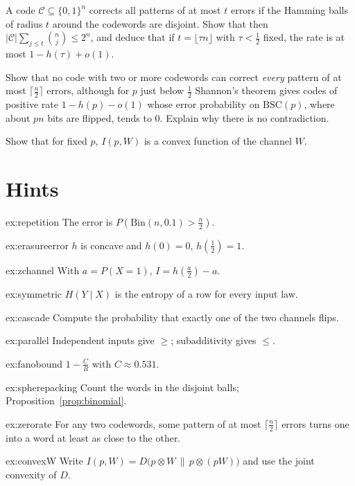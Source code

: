 \begin{exercise}[$\star\star$]\label{ex:spherepacking}
A code $\mathcal C\subseteq\{0,1\}^n$ corrects all patterns of at most $t$ errors if the Hamming balls of radius $t$ around the codewords are disjoint. Show that then $|\mathcal C|\sum_{j\le t}\binom nj\le2^n$, and deduce that if $t=\lfloor\tau n\rfloor$ with $\tau<\frac12$ fixed, the rate is at most $1-h(\tau)+o(1)$.
\end{exercise}

\begin{exercise}[$\star\star$]\label{ex:zerorate}
Show that no code with two or more codewords can correct \emph{every} pattern of at most $\lceil\frac n2\rceil$ errors, although for $p$ just below $\frac12$ Shannon's theorem gives codes of positive rate $1-h(p)-o(1)$ whose error probability on $\mathrm{BSC}(p)$, where about $pn$ bits are flipped, tends to $0$. Explain why there is no contradiction.
\end{exercise}

\begin{exercise}[$\star\star\star$]\label{ex:convexW}
Show that for fixed $p$, $I(p,W)$ is a convex function of the channel $W$.
\end{exercise}

\section{Hints}

\begin{hint}{ex:repetition}
The error is $P(\mathrm{Bin}(n,0.1)>\frac n2)$.
\end{hint}
\begin{hint}{ex:erasureerror}
$h$ is concave and $h(0)=0$, $h(\frac12)=1$.
\end{hint}
\begin{hint}{ex:zchannel}
With $a=P(X=1)$, $I=h(\frac a2)-a$.
\end{hint}
\begin{hint}{ex:symmetric}
$H(Y\mid X)$ is the entropy of a row for every input law.
\end{hint}
\begin{hint}{ex:cascade}
Compute the probability that exactly one of the two channels flips.
\end{hint}
\begin{hint}{ex:parallel}
Independent inputs give $\ge$; subadditivity gives $\le$.
\end{hint}
\begin{hint}{ex:fanobound}
$1-\frac CR$ with $C\approx0.531$.
\end{hint}
\begin{hint}{ex:spherepacking}
Count the words in the disjoint balls; Proposition~\ref{prop:binomial}.
\end{hint}
\begin{hint}{ex:zerorate}
For any two codewords, some pattern of at most $\lceil\frac n2\rceil$ errors turns one into a word at least as close to the other.
\end{hint}
\begin{hint}{ex:convexW}
Write $I(p,W)=D\bigl(p\otimes W\,\|\,p\otimes(pW)\bigr)$ and use the joint convexity of $D$.
\end{hint}

